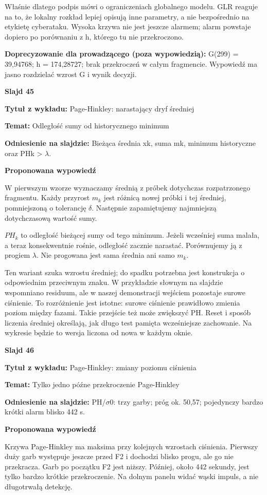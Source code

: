 \documentclass[a4paper,11pt]{article}
\newcommand{\NumerSlajdu}{1}
\newcommand{\Komentarz}[3]{%
  \gdef\NumerSlajdu{#1}%
  {\Large\bfseries Slajd #1\par}\smallskip
  \textbf{Tytuł z wykładu:} #2\par
  \textbf{Temat:} #3\par\medskip
}
\begin{document}
Właśnie dlatego podpis mówi o ograniczeniach globalnego modelu. GLR reaguje na to, że lokalny rozkład lepiej opisują inne parametry, a nie bezpośrednio na etykietę cyberataku. Wysoka krzywa nie jest jeszcze alarmem; alarm powstaje dopiero po porównaniu z h, którego tu nie przekroczono.

{\small\color{black!65}\textbf{Doprecyzowanie dla prowadzącego (poza wypowiedzią):} G(299) = 39,94768; h = 174,28727; brak przekroczeń w całym fragmencie. Wypowiedź ma jasno rozdzielać wzrost G i wynik decyzji.\par}
\clearpage

\Komentarz{45}{Page-Hinkley: narastający dryf średniej}{Odległość sumy od historycznego minimum}
{\small\color{black!65}\textbf{Odniesienie na slajdzie:} Bieżąca średnia xk, suma mk, minimum historyczne oraz PHk > \ensuremath{\lambda}.\par}
\medskip
\textbf{Proponowana wypowiedź}\par
W pierwszym wzorze wyznaczamy średnią z próbek dotychczas rozpatrzonego fragmentu. Każdy przyrost $m_k$ jest różnicą nowej próbki i tej średniej, pomniejszoną o tolerancję $\delta$. Następnie zapamiętujemy najmniejszą dotychczasową wartość sumy.

$PH_k$ to odległość bieżącej sumy od tego minimum. Jeżeli wcześniej suma malała, a teraz konsekwentnie rośnie, odległość zacznie narastać. Porównujemy ją z progiem $\lambda$. Nie progowana jest sama średnia ani samo $m_k$.

Ten wariant szuka wzrostu średniej; do spadku potrzebna jest konstrukcja o odpowiednim przeciwnym znaku. W przykładzie słownym na slajdzie wspomniano residuum, ale w naszej demonstracji wejściem pozostaje surowe ciśnienie. To rozróżnienie jest istotne: surowe ciśnienie prawidłowo zmienia poziom między fazami. Takie przejście też może zwiększyć PH. Reset i sposób liczenia średniej określają, jak długo test pamięta wcześniejsze zachowanie. Na wykresie będzie to wersja liczona od nowa w każdym oknie.
\clearpage

\Komentarz{46}{Page-Hinkley: zmiany poziomu ciśnienia}{Tylko jedno późne przekroczenie Page-Hinkley}
{\small\color{black!65}\textbf{Odniesienie na slajdzie:} PH/\ensuremath{\sigma}0: trzy garby; próg ok. 50,57; pojedynczy bardzo krótki alarm blisko 442 s.\par}
\medskip
\textbf{Proponowana wypowiedź}\par
Krzywa Page-Hinkley ma maksima przy kolejnych wzrostach ciśnienia. Pierwszy duży garb występuje jeszcze przed F2 i dochodzi blisko progu, ale go nie przekracza. Garb po początku F2 jest niższy. Później, około 442 sekundy, jest tylko bardzo krótkie przekroczenie. Na dolnym panelu widać wąski impuls, a nie długotrwałą detekcję.
\end{document}

